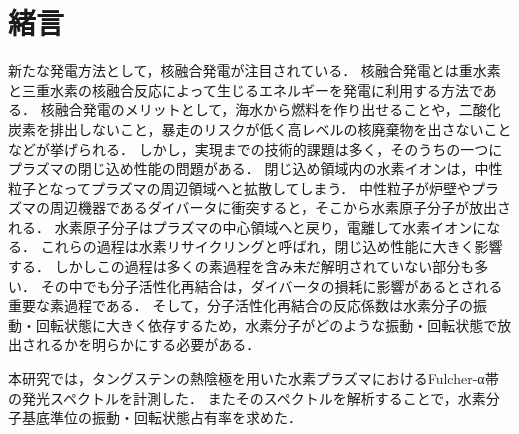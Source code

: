 \chapter{緒言}
新たな発電方法として，核融合発電が注目されている．
核融合発電とは重水素と三重水素の核融合反応によって生じるエネルギーを発電に利用する方法である．
核融合発電のメリットとして，海水から燃料を作り出せることや，二酸化炭素を排出しないこと，暴走のリスクが低く高レベルの核廃棄物を出さないことなどが挙げられる\cite{monbu-kagakusyou}．
しかし，実現までの技術的課題は多く，そのうちの一つにプラズマの閉じ込め性能の問題がある．
閉じ込め領域内の水素イオンは，中性粒子となってプラズマの周辺領域へと拡散してしまう．
中性粒子が炉壁やプラズマの周辺機器であるダイバータに衝突すると，そこから水素原子分子が放出される．
水素原子分子はプラズマの中心領域へと戻り，電離して水素イオンになる．
これらの過程は水素リサイクリングと呼ばれ，閉じ込め性能に大きく影響する\cite{hiramatsu}．
しかしこの過程は多くの素過程を含み未だ解明されていない部分も多い．
その中でも分子活性化再結合は，ダイバータの損耗に影響があるとされる重要な素過程である．
そして，分子活性化再結合の反応係数は水素分子の振動・回転状態に大きく依存するため，水素分子がどのような振動・回転状態で放出されるかを明らかにする必要がある\cite{ishihara}．

本研究では，タングステンの熱陰極を用いた水素プラズマにおけるFulcher-α帯の発光スペクトルを計測した．
またそのスペクトルを解析することで，水素分子基底準位の振動・回転状態占有率を求めた．